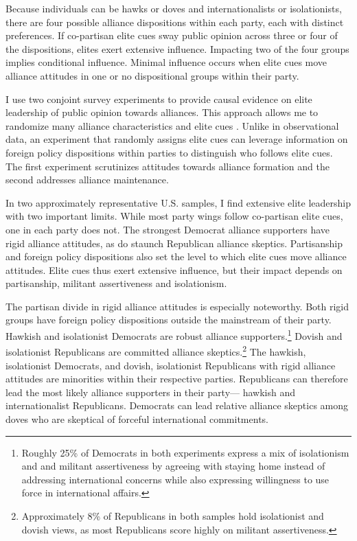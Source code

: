 \documentclass[12pt]{article}
\begin{document}
Because individuals can be hawks or doves and internationalists or isolationists, there are four possible alliance dispositions within each party, each with distinct preferences. 
If co-partisan elite cues sway public opinion across three or four of the dispositions, elites exert extensive influence. 
Impacting two of the four groups implies conditional influence. 
Minimal influence occurs when elite cues move alliance attitudes in one or no dispositional groups within their party.


I use two conjoint survey experiments to provide causal evidence on elite leadership of public opinion towards alliances.
This approach allows me to randomize many alliance characteristics and elite cues \citep{Hainmuelleretal2014}.
Unlike in observational data, an experiment that randomly assigns elite cues can leverage information on foreign policy dispositions within parties to distinguish who follows elite cues. 
The first experiment scrutinizes attitudes towards alliance formation and the second addresses alliance maintenance. 


In two approximately representative U.S. samples, I find extensive elite leadership with two important limits.
While most party wings follow co-partisan elite cues, one in each party does not.
The strongest Democrat alliance supporters have rigid alliance attitudes, as do staunch Republican alliance skeptics. 
Partisanship and foreign policy dispositions also set the level to which elite cues move alliance attitudes.
Elite cues thus exert extensive influence, but their impact depends on partisanship, militant assertiveness and isolationism.


The partisan divide in rigid alliance attitudes is especially noteworthy.
Both rigid groups have foreign policy dispositions outside the mainstream of their party. 
Hawkish and isolationist Democrats are robust alliance supporters.\footnote{Roughly 25\% of Democrats in both experiments express a mix of isolationism and and militant assertiveness by agreeing with staying home instead of addressing international concerns while also expressing willingness to use force in international affairs.}
Dovish and isolationist Republicans are committed alliance skeptics.\footnote{Approximately 8\% of Republicans in both samples hold isolationist and dovish views, as most Republicans score highly on militant assertiveness.} 
The hawkish, isolationist Democrats, and dovish, isolationist Republicans with rigid alliance attitudes are minorities within their respective parties. 
Republicans can therefore lead the most likely alliance supporters in their party--- hawkish and internationalist Republicans.
Democrats can lead relative alliance skeptics among doves who are skeptical of forceful international commitments.
\end{document}
